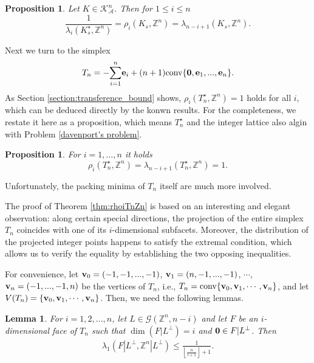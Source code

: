 \documentclass{amsart}
\newtheorem{lemma}[theorem]{Lemma}
\newtheorem{prop}[theorem]{Proposition}
\theoremstyle{definition}
\theoremstyle{remark}
\numberwithin{equation}{section}
\begin{document}
\begin{prop} Let $K\in\mathcal{K}^n_\mathcal{A}$. Then for $1\leq i\leq n$ 
\begin{equation*}
       \frac{1}{\lambda_{i}(K_s^\star,\mathbb{Z}^n)}=\rho_i(K_s,\mathbb{Z}^n)=\lambda_{n-i+1}(K_s,\mathbb{Z}^n).
\end{equation*} 
\label{prop:cube and crosspolytope}
\end{prop}

Next we turn to the simplex 
\begin{align*}
    T_n=-\overset{n}{\underset{i=1}{\sum}}{\bf e}_i+(n+1)\mathrm{conv}\{{\bf 0},{\bf e}_1,...,{\bf e}_n\}. 
\end{align*} 
As Section \ref{section:transference_bound} shows, $\rho_i(T_n^\star,\mathbb{Z}^n)=1$ holds for all $i$, which can be deduced directly by the konwn results. For the completeness, we restate it here as a proposition, which means $ T_n^\star$ and the integer lattice also algin with Problem \ref{davenport's problem}.

\begin{prop}\label{prop:rhoiTn*Zn}
For $i=1,\dots,n$ it holds 
    $${\rho}_i(T_n^\star,\mathbb{Z}^n)=\lambda_{n-i+1}(T_n^\star,\mathbb{Z}^n)=1.$$ 
\end{prop}

Unfortunately, the packing minima of $T_n$ itself are much more involved. 

The proof of  Theorem \ref{thm:rhoiTnZn} 
is based on an interesting and elegant observation: along certain special directions, the projection of the entire simplex $T_n$ coincides with one of its $i$-dimensional subfacets. Moreover, the distribution of the projected integer points happens to satisfy the extremal condition, which allows us to verify the equality by establishing the two opposing inequalities. 

For convenience, let ${\bf v}_0=(-1,-1,...,-1)$, ${\bf v}_1=(n,-1,...,-1)$, $\cdots$, ${\bf v}_n=(-1,...,-1,n)$ be the vertices of $T_n$, i.e., $T_n=\mathrm{conv}\{{\bf v}_0,{\bf v}_1,\cdots,{\bf v}_n\}$, and let $V(T_n)=\{{\bf v}_0,{\bf v}_1,\cdots,{\bf v}_n\}$. Then, we need the following lemmas.

\begin{lemma}\label{lem:upTnZn}
    For $i=1,2,...,n$, let $L\in\mathcal{G}(\mathbb{Z}^n,n-i)$ and let $F$ be an $i$-dimensional face of $T_n$ such that $\dim(F|L^\perp)=i$ and ${\bf 0}\in F|L^\perp$. Then 
    \begin{align*}
    \lambda_1(F|L^\perp,\mathbb{Z}^n|L^\perp)\leq\frac{1}{\left\lfloor\frac{n}{i+1}\right\rfloor+1}.  
    \end{align*}
\end{lemma}
\end{document}
